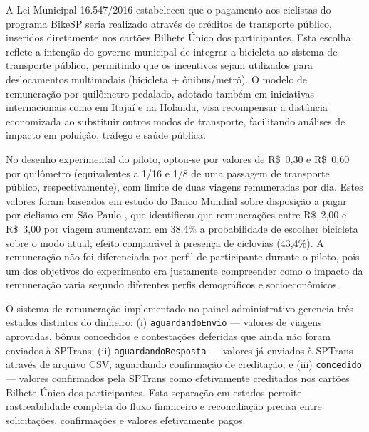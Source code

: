

A Lei Municipal 16.547/2016 estabeleceu
que o pagamento aos ciclistas do programa BikeSP seria realizado através de créditos
de transporte público, inseridos diretamente nos cartões Bilhete Único dos
participantes. Esta escolha reflete a intenção do governo municipal de integrar a
bicicleta ao sistema de transporte público, permitindo que os incentivos sejam
utilizados para deslocamentos multimodais (bicicleta + ônibus/metrô). O modelo de
remuneração por quilômetro pedalado, adotado também em iniciativas internacionais
como em Itajaí e na Holanda, visa recompensar a distância economizada ao
substituir outros modos de transporte, facilitando análises de impacto em poluição,
tráfego e saúde pública.

No desenho experimental do piloto, optou-se por valores de R\$~0,30 e R\$~0,60 por
quilômetro (equivalentes a 1/16 e 1/8 de uma passagem de transporte público,
respectivamente), com limite de duas viagens remuneradas por dia. Estes valores foram
baseados em estudo do Banco Mundial sobre disposição a pagar por ciclismo em São
Paulo \citep{worldbank2022}, que identificou que remunerações entre R\$~2,00 e R\$~3,00 por viagem
aumentavam em 38,4\% a probabilidade de escolher bicicleta sobre o modo atual,
efeito comparável à presença de ciclovias (43,4\%). A remuneração não foi
diferenciada por perfil de participante durante o piloto, pois um dos objetivos do
experimento era justamente compreender como o impacto da remuneração varia
segundo diferentes perfis demográficos e socioeconômicos.

O sistema de remuneração implementado no
painel administrativo gerencia três estados distintos do dinheiro: (i)
\texttt{aguardandoEnvio} --- valores de viagens aprovadas, bônus concedidos e
contestações deferidas que ainda não foram enviados à SPTrans; (ii)
\texttt{aguardandoResposta} --- valores já enviados à SPTrans através de arquivo
CSV, aguardando confirmação de creditação; e (iii) \texttt{concedido} --- valores
confirmados pela SPTrans como efetivamente creditados nos cartões Bilhete Único dos
participantes. Esta separação em estados permite rastreabilidade completa do fluxo
financeiro e reconciliação precisa entre solicitações, confirmações e valores
efetivamente pagos.

